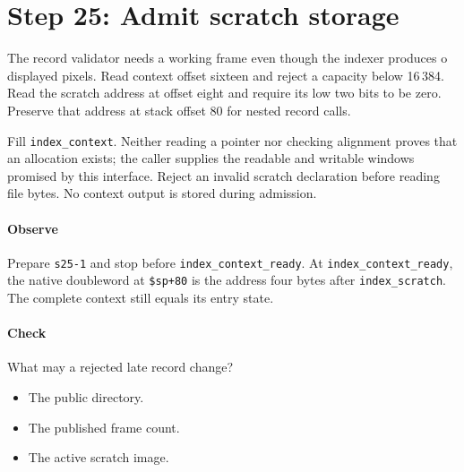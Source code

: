 \section{Step 25: Admit scratch storage}
The record validator needs a working frame even though the indexer produces
o displayed pixels. Read context offset sixteen and reject a capacity below
16\,384. Read the scratch address at offset eight and require its low two bits
to be zero. Preserve that address at stack offset 80 for nested record calls.

Fill \texttt{index\_context}. Neither reading a pointer nor checking alignment
proves that an allocation exists; the caller supplies the readable and writable
windows promised by this interface. Reject an invalid scratch declaration before
reading file bytes. No context output is stored during admission.

\paragraph{Observe} Prepare \texttt{s25-1} and stop before
\texttt{index\_context\_ready}. At \texttt{index\_context\_ready}, the native doubleword
at \texttt{\$sp+80} is the address four bytes after
\texttt{index\_scratch}. The complete context still equals its entry state.

\paragraph{Check} What may a rejected late record change?
\begin{itemize}
  \item[A.] The public directory.
  \item[B.] The published frame count.
  \item[C.] The active scratch image.
\end{itemize}
